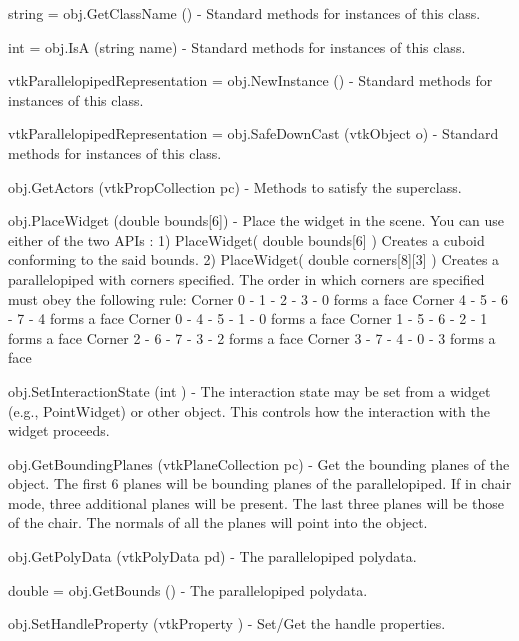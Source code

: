 \begin{DoxyItemize}
\item {\ttfamily string = obj.\-Get\-Class\-Name ()} -\/ Standard methods for instances of this class.  
\item {\ttfamily int = obj.\-Is\-A (string name)} -\/ Standard methods for instances of this class.  
\item {\ttfamily vtk\-Parallelopiped\-Representation = obj.\-New\-Instance ()} -\/ Standard methods for instances of this class.  
\item {\ttfamily vtk\-Parallelopiped\-Representation = obj.\-Safe\-Down\-Cast (vtk\-Object o)} -\/ Standard methods for instances of this class.  
\item {\ttfamily obj.\-Get\-Actors (vtk\-Prop\-Collection pc)} -\/ Methods to satisfy the superclass.  
\item {\ttfamily obj.\-Place\-Widget (double bounds\mbox{[}6\mbox{]})} -\/ Place the widget in the scene. You can use either of the two A\-P\-Is \-: 1) Place\-Widget( double bounds\mbox{[}6\mbox{]} ) Creates a cuboid conforming to the said bounds. 2) Place\-Widget( double corners\mbox{[}8\mbox{]}\mbox{[}3\mbox{]} ) Creates a parallelopiped with corners specified. The order in which corners are specified must obey the following rule\-: Corner 0 -\/ 1 -\/ 2 -\/ 3 -\/ 0 forms a face Corner 4 -\/ 5 -\/ 6 -\/ 7 -\/ 4 forms a face Corner 0 -\/ 4 -\/ 5 -\/ 1 -\/ 0 forms a face Corner 1 -\/ 5 -\/ 6 -\/ 2 -\/ 1 forms a face Corner 2 -\/ 6 -\/ 7 -\/ 3 -\/ 2 forms a face Corner 3 -\/ 7 -\/ 4 -\/ 0 -\/ 3 forms a face  
\item {\ttfamily obj.\-Set\-Interaction\-State (int )} -\/ The interaction state may be set from a widget (e.\-g., Point\-Widget) or other object. This controls how the interaction with the widget proceeds.  
\item {\ttfamily obj.\-Get\-Bounding\-Planes (vtk\-Plane\-Collection pc)} -\/ Get the bounding planes of the object. The first 6 planes will be bounding planes of the parallelopiped. If in chair mode, three additional planes will be present. The last three planes will be those of the chair. The normals of all the planes will point into the object.  
\item {\ttfamily obj.\-Get\-Poly\-Data (vtk\-Poly\-Data pd)} -\/ The parallelopiped polydata.  
\item {\ttfamily double = obj.\-Get\-Bounds ()} -\/ The parallelopiped polydata.  
\item {\ttfamily obj.\-Set\-Handle\-Property (vtk\-Property )} -\/ Set/\-Get the handle properties.  

\end{DoxyItemize}
